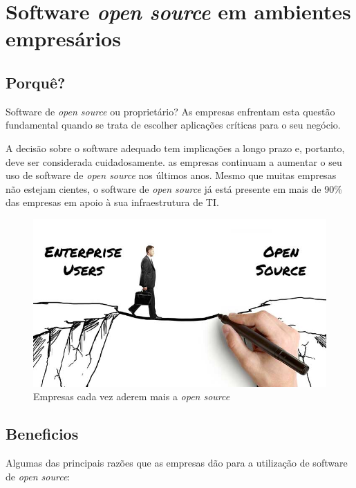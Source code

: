 \section{Software \textit{open source} em ambientes empresários} \label{section: aquisição}
\subsection{Porquê?}
Software de \textit{open source} ou proprietário? As empresas enfrentam esta questão fundamental quando se trata de escolher aplicações críticas para o seu negócio. 
\par \vspace{6pt}
A decisão sobre o software adequado tem implicações a longo prazo e, portanto, deve ser considerada cuidadosamente. as empresas continuam a aumentar o seu uso de software de \textit{open source} nos últimos anos. Mesmo que muitas empresas não estejam cientes, o software de \textit{open source} já está presente em mais de 90\% das empresas em apoio à sua infraestrutura de TI. \cite{whyOpenSource}

\begin{figure}[H]
  \centering
  \includegraphics[scale=0.6]{Figures/0. General/enterprise_open_source.jpg}
  \caption{Empresas cada vez aderem mais a \textit{open source}}
  \label{Empresas cada vez aderem mais a open source}
\end{figure}

\subsection{Beneficios}
Algumas das principais razões que as empresas dão para a utilização de software de \textit{open source}: \cite{stateOfEnterpriseOpenSource}

